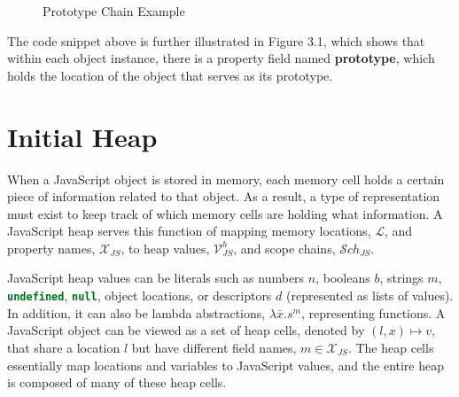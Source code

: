 \documentclass[a4paper,11pt,twoside]{report}
\def\jsinline{\lstinline[language=JavaScript, basicstyle=\small]}%\end{lstlisting}
\begin{document}
\begin{figure}[!h]
\begin{center}
\caption{Prototype Chain Example}
\vspace*{-0.5cm}
\label{fig:initheap}
\end{center}
\end{figure}

The code snippet above is further illustrated in Figure 3.1, which shows that within each object instance, there is a property field named \textbf{prototype}, which holds the location of the object that serves as its prototype.


\section{Initial Heap}\label{sec:jsheap}
When a JavaScript object is stored in memory, each memory cell holds a certain piece of information related to that object. As a result, a type of representation must exist to keep track of which memory cells are holding what information. A JavaScript heap serves this function of mapping memory locations, $\mathcal{L}$, and property names, $\mathcal{X}_{JS}$, to heap values, $\mathcal{V}_{JS}^h$, and scope chains, $\mathcal{S}ch_{JS}$. 

JavaScript heap values can be literals such as numbers $n$, booleans $b$, strings $m$, \jsinline|undefined|, \jsinline|null|, object locations, or descriptors $d$ (represented as lists of values). In addition, it can also be lambda abstractions, $\lambda \bar{x}.s^m$, representing functions. A JavaScript object can be viewed as a set of heap cells, denoted by $(l, x) \mapsto v$, that share a location $l$ but have different field names, $m \in \mathcal{X}_{JS}$. The heap cells essentially map locations and variables to JavaScript values, and the entire heap is composed of many of these heap cells. 
\end{document}
